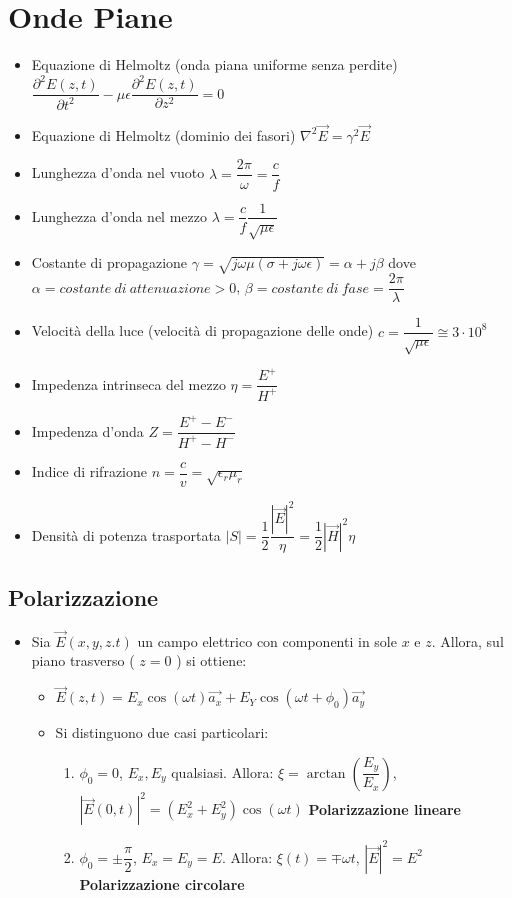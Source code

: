 \documentclass{article}
\begin{document}
\section{Onde Piane}
\begin{itemize}
	\item Equazione di Helmoltz (onda piana uniforme senza perdite) \( \dfrac{\partial^2 E(z, t)}{\partial t^2} - \mu \epsilon \dfrac{\partial^2 E(z, t)}{\partial z^2} = 0\)
	\item Equazione di Helmoltz (dominio dei fasori) \( \nabla^2 \vec{E} = \gamma^2 \vec{E} \)
	\item Lunghezza d'onda nel vuoto \( \lambda = \dfrac{2 \pi}{\omega} = \dfrac{c}{f} \)	
	\item Lunghezza d'onda nel mezzo \( \lambda = \dfrac{c}{f} \dfrac{1}{\sqrt{\mu \epsilon}} \)
	\item Costante di propagazione \( \gamma = \sqrt{j\omega\mu (\sigma + j \omega \epsilon) } = \alpha + j \beta \) dove \( \alpha = costante\ di\ attenuazione > 0\), \newline \( \beta = costante\ di\ fase = \dfrac{2 \pi}{\lambda} \)
	\item Velocità della luce (velocità di propagazione delle onde) \( c = \dfrac{1}{\sqrt{\mu \epsilon}} \cong 3 \cdot 10^8 \)
	\item Impedenza intrinseca del mezzo \( \eta = \dfrac{E^+}{H^+} \)
	\item Impedenza d'onda \( Z = \dfrac{E^+ - E^-}{H^+ - H^-} \)
	\item Indice di rifrazione \( n = \dfrac{c}{v} = \sqrt{\epsilon_r \mu_r} \)
	\item Densità di potenza trasportata \( |S| = \dfrac{1}{2} \dfrac{|\vec{E}|^2}{\eta} = \dfrac{1}{2} |\vec{H}|^2 \eta \)
\end{itemize}

\subsection{Polarizzazione}
\begin{itemize}
	\item Sia \( \vec{E}(x, y, z. t) \) un campo elettrico con componenti in sole \( x \) e \( z \). Allora, sul piano trasverso ( \( z = 0 \) ) si ottiene:
	\begin{itemize}
		\item \( \vec{E}(z, t) = E_x \cos ( \omega t) \vec{a_x} + E_Y \cos( \omega t + \phi_0) \vec{a_y}  \)
		\item Si distinguono due casi particolari:
		\begin{enumerate}
			\item \( \phi_0 = 0 \), \( E_x, E_y \) qualsiasi. Allora: \( \xi  = \arctan\left(\dfrac{E_y}{E_x}\right) \), \( |\vec{E}(0, t)|^2 = (E_x^2 + E_y^2) \cos(\omega t) \) \textbf{Polarizzazione lineare}
			\item  \( \phi_0 = \pm \dfrac{\pi}{2} \), \( E_x = E_y = E \). Allora: \( \xi(t)  = \mp \omega t \), \( |\vec{E}|^2 = E^2 \) \textbf{Polarizzazione circolare}
		\end{enumerate}
	\end{itemize}	  
\end{itemize}
\end{document}
